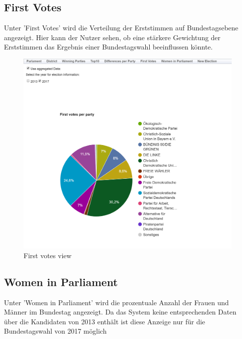 \documentclass[a4paper]{scrreprt}
\begin{document}
\subsection{First Votes}

Unter 'First Votes' wird die Verteilung der Erststimmen auf Bundestagsebene angezeigt. Hier kann der Nutzer sehen, ob eine stärkere Gewichtung der Erststimmen das Ergebnis einer Bundestagswahl beeinflussen könnte.

\begin{figure}[H]
\centering
\includegraphics[width=\textwidth]{images/first_votes.png}
\caption {First votes view}
\end{figure}

\subsection{Women in Parliament}

Unter 'Women in Parliament' wird die prozentuale Anzahl der Frauen und Männer im Bundestag angezeigt. Da das System keine entsprechenden Daten über die Kandidaten von 2013 enthält ist diese Anzeige nur für die Bundestagswahl von 2017 möglich
\end{document}

